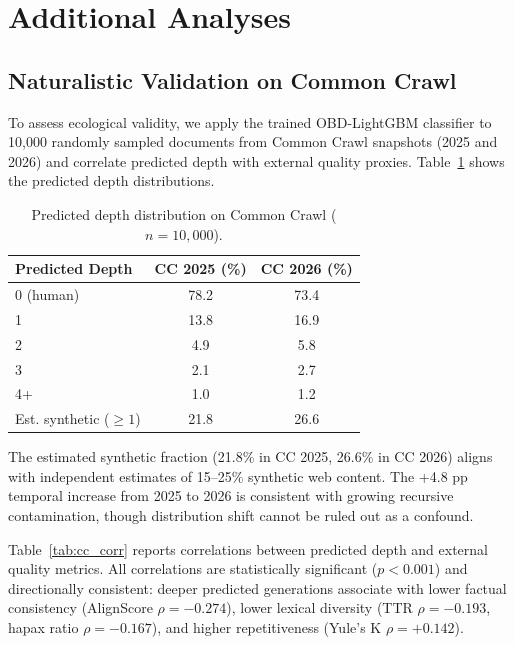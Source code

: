 \documentclass[11pt,a4paper]{article}
\begin{document}
\section{Additional Analyses}
\label{sec:additional}

\subsection{Naturalistic Validation on Common Crawl}
\label{sec:cc_validation}

To assess ecological validity, we apply the trained OBD-LightGBM classifier to 10,000 randomly sampled documents from Common Crawl snapshots (2025 and 2026) and correlate predicted depth with external quality proxies. Table~\ref{tab:cc_depth} shows the predicted depth distributions.

\begin{table}[t]
\centering
\caption{Predicted depth distribution on Common Crawl ($n = 10{,}000$).}
\label{tab:cc_depth}
\small
\begin{tabular}{lcc}
\toprule
\textbf{Predicted Depth} & \textbf{CC 2025 (\%)} & \textbf{CC 2026 (\%)} \\
\midrule
0 (human)   & 78.2 & 73.4 \\
1           & 13.8 & 16.9 \\
2           & 4.9  & 5.8  \\
3           & 2.1  & 2.7  \\
4+          & 1.0  & 1.2  \\
\midrule
Est. synthetic ($\geq 1$) & 21.8 & 26.6 \\
\bottomrule
\end{tabular}
\end{table}

The estimated synthetic fraction (21.8\% in CC 2025, 26.6\% in CC 2026) aligns with independent estimates of 15--25\% synthetic web content. The +4.8 pp temporal increase from 2025 to 2026 is consistent with growing recursive contamination, though distribution shift cannot be ruled out as a confound.

Table~\ref{tab:cc_corr} reports correlations between predicted depth and external quality metrics. All correlations are statistically significant ($p < 0.001$) and directionally consistent: deeper predicted generations associate with lower factual consistency (AlignScore $\rho = -0.274$), lower lexical diversity (TTR $\rho = -0.193$, hapax ratio $\rho = -0.167$), and higher repetitiveness (Yule's K $\rho = +0.142$).
\end{document}
